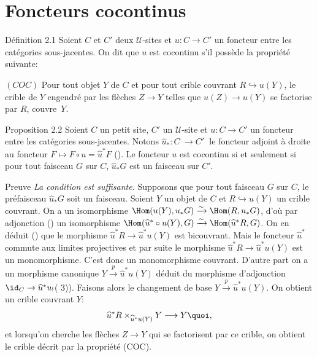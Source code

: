 \documentclass[10pt]{../fichiers-configuration-latex/smfart}
\begin{document}
\section{Foncteurs cocontinus}

\begin{enonce*}{Définition 2.1}
Soient $C$ et $C'$ deux $𝒰$-sites et $u:C\rightarrow C'$ un
foncteur entre les catégories sous-jacentes. On dit que $u$ est
cocontinu s'il possède la propriété suivante:

$(COC)$ Pour tout objet $Y$ de $C$ et pour tout crible couvrant
$R\hookrightarrow u(Y)$, le crible de $Y$ engendré par les
flèches $Z\rightarrow Y$ telles que $u(Z)\rightarrow u(Y)$ se
factorise par $R$, couvre~$Y$.
\end{enonce*}

\begin{enonce*}{Proposition 2.2}
Soient $C$ un petit site, $C'$ un $𝒰$-site et
$u:C\rightarrow C'$ un foncteur entre les catégories sous-jacentes.
Notons $\widehat{u}_{\ast}:C^{\widehat{\phantom{,}}}\rightarrow
{C'}^{\widehat{\phantom{,}}}$ le foncteur adjoint à droite au
foncteur $F\mapsto F\circ u=\widehat{u}^{\ast}F$ {\rm
().} Le foncteur $u$ est cocontinu si et seulement si
pour tout faisceau $G$ sur $C$, $\widehat{u}_{\ast}G$ est un
faisceau sur $C'$.
\end{enonce*}

\begin{enonce*}[remark]{Preuve}
\emph{La condition est suffisante.} Supposons que pour tout faisceau
$G$ sur $C$, le préfaisceau $\widehat{u}_{\ast}G$ soit un faisceau.
Soient $Y$ un objet de $C$ et $R\hookrightarrow u(Y)$ un crible
couvrant. On a un isomorphisme $\Hom(u(Y),
u_{\ast}G)\xrightarrow{\sim}\Hom(R,u_{\ast}G)$, d'où par
adjonction () un isomorphisme
$\Hom(\widehat{u}^{\ast}\circ
u(Y),G)\xrightarrow{\sim}\Hom(\widehat{u}^{\ast}R,G)$. On en déduit
() que le morphisme $\widehat{u}^{\ast}R\rightarrow
\widehat{u}^{\ast}u(Y)$ est bicouvrant. Mais le foncteur
$\widehat{u}^{\ast}$ commute aux limites projectives et par suite le
morphisme $\widehat{u}^{\ast}R\rightarrow \widehat{u}^{\ast}u(Y)$
est un monomorphisme. C'est donc un monomorphisme couvrant. D'autre
part on a un morphisme canonique
$Y\xrightarrow{p}\widehat{u}^{\ast}u(Y)$ déduit du morphisme
d'adjonction $\id_C\rightarrow
\widehat{u}^{\ast}u_{!}$\pageoriginale ( 3)). Faisons
alors le changement de base
$Y\xrightarrow{p}\widehat{u}^{\ast}u(Y)$. On obtient un crible
couvrant $Y$:
$$
\widehat{u}^{\ast}R\times_{\widehat{u}^{\ast}u(Y)}Y\longrightarrow
Y{\quoi},
$$
et lorsqu'on cherche les flèches $Z\rightarrow Y$ qui se
factorisent par ce crible, on obtient le crible décrit par la
propriété (COC).
\end{enonce*}
\end{document}
